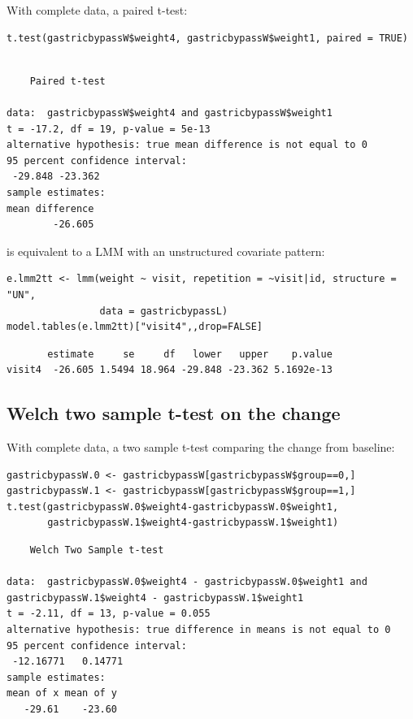 \documentclass[12pt]{article}
\begin{document}
With complete data, a paired t-test:
\lstset{language=r,label= ,caption= ,captionpos=b,numbers=none}
\begin{lstlisting}
t.test(gastricbypassW$weight4, gastricbypassW$weight1, paired = TRUE)
\end{lstlisting}

\begin{verbatim}

	Paired t-test

data:  gastricbypassW$weight4 and gastricbypassW$weight1
t = -17.2, df = 19, p-value = 5e-13
alternative hypothesis: true mean difference is not equal to 0
95 percent confidence interval:
 -29.848 -23.362
sample estimates:
mean difference 
        -26.605
\end{verbatim}

is equivalent to a LMM with an unstructured covariate pattern:
\lstset{language=r,label= ,caption= ,captionpos=b,numbers=none}
\begin{lstlisting}
e.lmm2tt <- lmm(weight ~ visit, repetition = ~visit|id, structure = "UN",
                data = gastricbypassL)
model.tables(e.lmm2tt)["visit4",,drop=FALSE]
\end{lstlisting}

\begin{verbatim}
       estimate     se     df   lower   upper    p.value
visit4  -26.605 1.5494 18.964 -29.848 -23.362 5.1692e-13
\end{verbatim}


\clearpage

\subsection{Welch two sample t-test on the change}
\label{sec:org2fcb2c9}

With complete data, a two sample t-test comparing the change from baseline:
\lstset{language=r,label= ,caption= ,captionpos=b,numbers=none}
\begin{lstlisting}
gastricbypassW.0 <- gastricbypassW[gastricbypassW$group==0,]
gastricbypassW.1 <- gastricbypassW[gastricbypassW$group==1,]
t.test(gastricbypassW.0$weight4-gastricbypassW.0$weight1,
       gastricbypassW.1$weight4-gastricbypassW.1$weight1)
\end{lstlisting}

\begin{verbatim}
	Welch Two Sample t-test

data:  gastricbypassW.0$weight4 - gastricbypassW.0$weight1 and gastricbypassW.1$weight4 - gastricbypassW.1$weight1
t = -2.11, df = 13, p-value = 0.055
alternative hypothesis: true difference in means is not equal to 0
95 percent confidence interval:
 -12.16771   0.14771
sample estimates:
mean of x mean of y 
   -29.61    -23.60
\end{verbatim}
\end{document}
